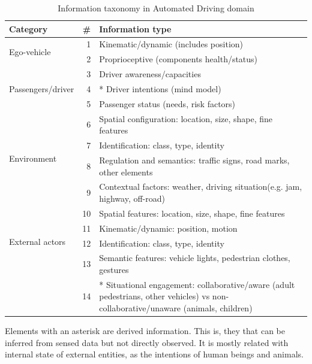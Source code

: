 \begin{table}%
    \caption{Information taxonomy in Automated Driving domain}
    \label{tab:info-taxonomy}
    \begin{tabular*}{\linewidth}{lr p{5.5cm}} %
        \hline %
        \textbf{Category} & \textbf{\#}	& \textbf{Information type}	\\
        \hline %
        \multirow{2}{*}{Ego-vehicle}
        & 1 & Kinematic/dynamic (includes position) \\
        & 2 & Proprioceptive (components health/status) \\
        \hline %
        \multirow{3}{*}{Passengers/driver}
        & 3 & Driver awareness/capacities \\
        & 4 & * Driver intentions (mind model)  \\
        & 5 & Passenger status (needs, risk factors) \\
        \hline %
        \multirow{4}{*}{Environment}
        & 6 & Spatial configuration: location, size, shape, fine features 
        \\
        & 7 & Identification: class, type, identity \\
        & 8 & Regulation and semantics: traffic signs, road marks, other 
        elements \\
        & 9 & Contextual factors: weather, driving situation(e.g. jam, 
        highway, off-road) \\
        \hline %
        \multirow{4}{*}{External actors}
        & 10 & Spatial features: location, size, shape, fine features  \\
        & 11 & Kinematic/dynamic: position, motion \\
        & 12 & Identification: class, type, identity \\ 
        & 13 & Semantic features: vehicle lights, pedestrian clothes, gestures 
        \\
        & 14 & * Situational engagement: collaborative/aware 
        (adult pedestrians, other vehicles) vs non-collaborative/unaware 
        (animals, children) \\ 
        \hline %
    \end{tabular*}
\end{table}

Elements with an asterisk are derived information. This is, they that can 
be inferred from sensed data but not directly observed. It is mostly related 
with internal state of external entities, as the intentions of human beings and 
animals.

